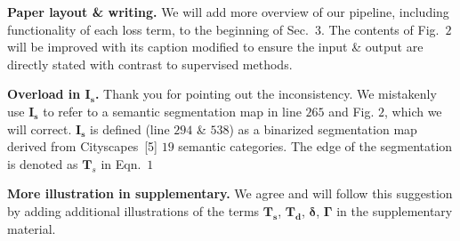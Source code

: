\documentclass[10pt,twocolumn,letterpaper]{article}
\newcommand{\Paragraph}[1]{\vspace{0.40mm} \noindent \textbf{#1} \hspace{0mm}}
\begin{document}
\Paragraph{Paper layout \& writing.} 
We will add more overview of our pipeline, including functionality of each loss term, to the beginning of Sec.~$3$. 
The contents of Fig.~$2$ will be improved with its caption modified to ensure the input \& output are directly stated with contrast to supervised methods. 

\Paragraph{Overload in $\mathbf{I_s}$.} 
Thank you for pointing out the inconsistency. 
We mistakenly use $\mathbf{I_s}$ to refer to a semantic segmentation map in line $265$ and Fig. $2$, which we will correct. 
$\mathbf{I_s}$ is defined (line $294$ \& $538$) as a binarized segmentation map derived from Cityscapes~[5] $19$ semantic categories. 
The edge of the segmentation is denoted as $\mathbf{T}_s$ in Eqn.~$1$

\Paragraph{More illustration in supplementary.} 
We agree and will follow this suggestion by adding additional illustrations of the terms $\mathbf{T_s}$, $\mathbf{T_d}$, $\mathbf{\delta}$, $\mathbf{\Gamma}$ in the supplementary material.
\end{document}
